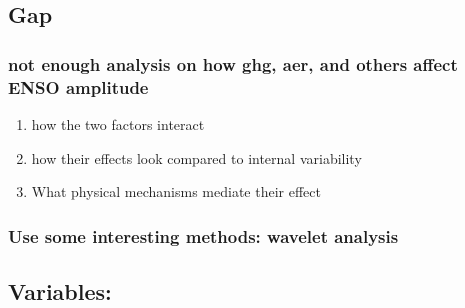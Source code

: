 \documentclass[11pt]{article}
\begin{document}
\subsection{Gap}
\label{sec:orga9e7bba}
\subsubsection{not enough analysis on how ghg, aer, and others affect ENSO amplitude}
\label{sec:org9c142a4}
\begin{enumerate}
\item how the two factors interact
\label{sec:org2cfc500}
\item how their effects look compared to internal variability
\label{sec:orgf657ec5}
\item What physical mechanisms mediate their effect
\label{sec:org99afee8}
\end{enumerate}
\subsubsection{Use some interesting methods: wavelet analysis}
\label{sec:org8f83908}
\subsection{Variables:}
\label{sec:org9774955}
\end{document}
